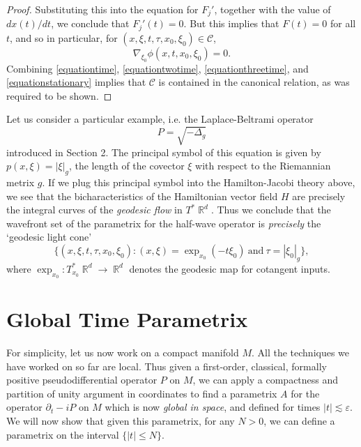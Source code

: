 \documentclass{article}
\theoremstyle{plain}
\theoremstyle{remark}
\theoremstyle{definition}
\DeclareMathOperator{\RR}{\mathbb{R}}
\begin{document}
\begin{proof}
	Substituting this into the equation for $F_j'$, together with the value of $dx(t) / dt$, we conclude that $F_j'(t) = 0$. But this implies that $F(t) = 0$ for all $t$, and so in particular, for $(x,\xi,t,\tau,x_0,\xi_0) \in \mathcal{C}$,
	\begin{equation} \label{equationstationary}
		\nabla_{\xi_0} \phi(x,t,x_0,\xi_0) = 0.
	\end{equation}
	Combining \eqref{equationtime}, \eqref{equationtwotime}, \eqref{equationthreetime}, and \eqref{equationstationary} implies that $\mathcal{C}$ is contained in the canonical relation, as was required to be shown.
\end{proof}

Let us consider a particular example, i.e. the Laplace-Beltrami operator
%
\[ P = \sqrt{-\Delta_g} \]
%
introduced in Section 2. The principal symbol of this equation is given by $p(x,\xi) = |\xi|_g$, the length of the covector $\xi$ with respect to the Riemannian metrix $g$. If we plug this principal symbol into the Hamilton-Jacobi theory above, we see that the bicharacteristics of the Hamiltonian vector field $H$ are precisely the integral curves of the \emph{geodesic flow} in $T^* \RR^d$. Thus we conclude that the wavefront set of the parametrix for the half-wave operator is \emph{precisely} the `geodesic light cone'
%
\[ \Big\{ (x,\xi,t,\tau,x_0,\xi_0) : (x,\xi) = \exp_{x_0}(- t \xi_0)\ \text{and}\ \tau = |\xi_0|_g \Big\}, \]
%
where $\exp_{x_0}: T^*_{x_0} \RR^d \to \RR^d$ denotes the geodesic map for cotangent inputs.

\section{Global Time Parametrix}

For simplicity, let us now work on a compact manifold $M$. All the techniques we have worked on so far are local. Thus given a first-order, classical, formally positive pseudodifferential operator $P$ on $M$, we can apply a compactness and partition of unity argument in coordinates to find a parametrix $A$ for the operator $\partial_t - iP$ on $M$ which is now \emph{global in space}, and defined for times $|t| \lesssim \varepsilon$. We will now show that given this parametrix, for any $N > 0$, we can define a parametrix on the interval $\{ |t| \leq N \}$.
\end{document}

